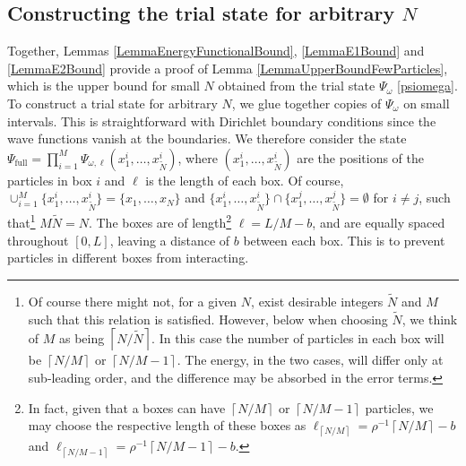\documentclass[a4paper,11pt]{article}
\newcommand{\ceil}[1]{\left\lceil #1 \right\rceil}
\numberwithin{equation}{section}
\begin{document}
\subsection{Constructing the trial state for arbitrary $N$}
\label{secarbN}
Together, Lemmas \ref{LemmaEnergyFunctionalBound}, \ref{LemmaE1Bound} and \ref{LemmaE2Bound} provide a proof of Lemma \ref{LemmaUpperBoundFewParticles}, which is the upper bound for small $N$ obtained from the trial state $\Psi_\omega$ \eqref{psiomega}. To construct a trial state for arbitrary $N$, we glue together copies of $\Psi_\omega$ on small intervals. This is straightforward with Dirichlet boundary conditions since the wave functions vanish at the boundaries. We therefore consider the state $ \Psi_{\text{full}}=\prod_{i=1}^{M}\Psi_{\omega,\ell}(x^i_1,\dots,x^i_{\tilde{N}}) $, where $ (x_1^i,\dots,x_{\tilde{N}}^i) $ are the positions of the particles in box $ i $ and $ \ell $ is the length of each box. Of course, $ \cup_{i=1}^{M}\{x_1^i,\dots,x_{\tilde{N}}^i\}=\{x_1,\dots,x_N\} $ and $ \{x_1^i,\dots,x_{\tilde{N}}^i\}\cap\{x_1^j,\dots,x_{\tilde{N}}^j\}=\emptyset $ for $ i\neq j $, such that\footnote{Of course there might not, for a given $N$, exist desirable integers $\tilde{N}$ and $M$ such that this relation is satisfied. However, below when choosing $\tilde{N}$, we think of $M$ as being $\ceil{N/\tilde{N}}$. In this case the number of particles in each box will be $\ceil{N/M}$ or $\ceil{N/M-1}$. The energy, in the two cases, will differ only at sub-leading order, and the difference may be absorbed in the error terms.} $ M\tilde{N}=N $. The boxes are of length\footnote{ In fact, given that a boxes can have $\ceil{N/M}$ or $\ceil{N/M-1}$ particles, we may choose the respective length of these boxes as $\ell_{\ceil{N/M}}=\rho^{-1}\ceil{N/M}-b$ and $\ell_{\ceil{N/M-1}}=\rho^{-1}\ceil{N/M-1}-b$.} $ \ell=L/M-b $, and are equally spaced throughout $ [0,L] $, leaving a distance of $ b $ between each box. This is to prevent particles in different boxes from interacting.
\end{document}
